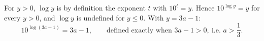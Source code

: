 For $y>0$, $\log y$ is by definition the exponent $t$ with $10^t=y$. Hence $10^{\log y}=y$ for every $y>0$, and $\log y$ is undefined for $y\le0$. With $y=3a-1$:
\[10^{\log(3a-1)}=\boxed{3a-1},\qquad\text{defined exactly when }3a-1>0,\ \text{i.e. }a>\dfrac13.\]
